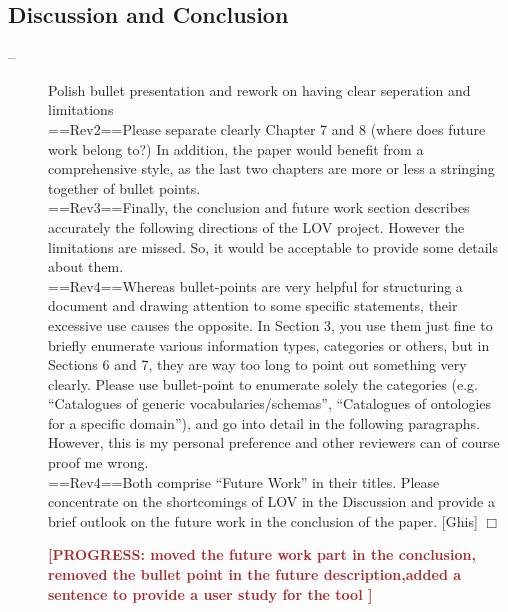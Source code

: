 \documentclass[a4paper,notitlepage]{article}
\newcommand{\progress}[1]{\textcolor{brown}{\textbf{[PROGRESS: #1]}}}
\newcommand\todo[2]{\item[--] #1 \hfill[#2] $\Box$}%
\begin{document}
\subsection{Discussion and Conclusion}
\begin{description}
 \todo{Polish bullet presentation and rework on having clear seperation and limitations \\
==Rev2==Please separate clearly Chapter 7 and 8 (where does future work belong to?) In addition, the paper would benefit from a comprehensive style, as the last two chapters are more or less a stringing together of bullet points.\\
==Rev3==Finally, the conclusion and future work section describes accurately the following directions of the LOV project. However the limitations are missed. So, it would be acceptable to provide some details about them.\\
==Rev4==Whereas bullet-points are very helpful for structuring a document and drawing attention to some specific statements, their excessive use causes the opposite. In Section 3, you use them just fine to briefly enumerate various information types, categories or others, but in Sections 6 and 7, they are way too long to point out something very clearly. Please use bullet-point to enumerate solely the categories (e.g. “Catalogues of generic vocabularies/schemas”, “Catalogues of ontologies for a specific domain”), and go into detail in the following paragraphs. However, this is my personal preference and other reviewers can of course proof me wrong.\\
==Rev4==Both comprise “Future Work” in their titles. Please concentrate on the shortcomings of LOV in the Discussion and provide a brief outlook on the future work in the conclusion of the paper.}{Ghis}

\progress{moved the future work part in the conclusion, removed the bullet point in the future description,added a sentence to provide a user study for the tool }

\end{description}
\end{document}

